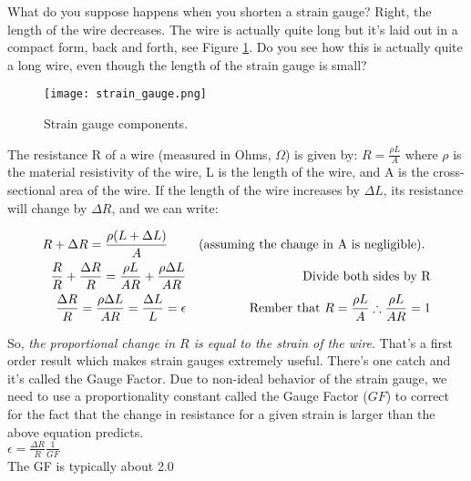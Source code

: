 \documentclass[10pt]{article}
\begin{document}
What do you suppose happens when you shorten a strain gauge?  Right, the length of the wire decreases.  The wire is actually quite long but it’s laid out in a compact form, back and forth, see Figure \ref{fig:str_gauge}. Do you see how this is actually quite a long wire, even though the length of the strain gauge is small?  
\begin{figure}[ht]
	\centering
	\texttt{[image: strain\_gauge.png]}
	\caption{Strain gauge components.}
	\label{fig:str_gauge}
\end{figure}

The resistance R of a wire (measured in Ohms, $ \Omega $) is given by:  $ R = \frac{\rho L}{A} $ where $ \rho $ is the material resistivity of the wire, L is the length of the wire, and A is the cross-sectional area of the wire.  If the length of the wire increases by $ \Delta L $, its resistance will change by $ \Delta R $, and we can write:

\begin{align}
	R + \Delta R = \frac{\rho (L + \Delta L)}{A} \hspace{0.5cm} && \text{(assuming the change in A is negligible). } \\
	\frac{R}{R} + \frac{\Delta R}{R} = \frac{\rho L}{A R} + \frac{\rho \Delta L}{A R} && \text{Divide both sides by R} \\
	\frac{\Delta R}{R} = \frac{\rho \Delta L}{A R} = \frac{\Delta L}{L} = \epsilon && \text{Rember that } R = \frac{\rho L}{A} \therefore \frac{\rho L}{A R} = 1
\end{align}

So, \textit{the proportional change in $ R $ is equal to the strain of the wire}. That’s a first order result which makes strain gauges extremely useful. There’s one catch and it’s called the Gauge Factor. Due to non-ideal behavior of the strain gauge, we need to use a proportionality constant called the Gauge Factor ($ GF $) to correct for the fact that the change in resistance for a given strain is larger than the above equation predicts.
\\
$ \epsilon = \frac{\Delta R}{R} \frac{1}{GF} $\\

The GF is typically about 2.0\\
\end{document}

